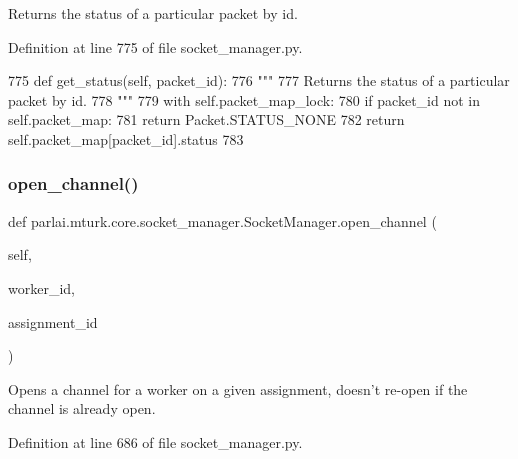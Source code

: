 \begin{DoxyVerb}Returns the status of a particular packet by id.
\end{DoxyVerb}
 

Definition at line 775 of file socket\+\_\+manager.\+py.


\begin{DoxyCode}
775     \textcolor{keyword}{def }get\_status(self, packet\_id):
776         \textcolor{stringliteral}{"""}
777 \textcolor{stringliteral}{        Returns the status of a particular packet by id.}
778 \textcolor{stringliteral}{        """}
779         with self.packet\_map\_lock:
780             \textcolor{keywordflow}{if} packet\_id \textcolor{keywordflow}{not} \textcolor{keywordflow}{in} self.packet\_map:
781                 \textcolor{keywordflow}{return} Packet.STATUS\_NONE
782             \textcolor{keywordflow}{return} self.packet\_map[packet\_id].status
783 
\end{DoxyCode}
\mbox{\label{classparlai_1_1mturk_1_1core_1_1socket__manager_1_1SocketManager_aa970567ac565617328cd1a07548b1427}} 
\subsubsection{\texorpdfstring{open\+\_\+channel()}{open\_channel()}}
{\footnotesize\ttfamily def parlai.\+mturk.\+core.\+socket\+\_\+manager.\+Socket\+Manager.\+open\+\_\+channel (\begin{DoxyParamCaption}\item[{}]{self,  }\item[{}]{worker\+\_\+id,  }\item[{}]{assignment\+\_\+id }\end{DoxyParamCaption})}

\begin{DoxyVerb}Opens a channel for a worker on a given assignment, doesn't re-open if the
channel is already open.
\end{DoxyVerb}
 

Definition at line 686 of file socket\+\_\+manager.\+py.


